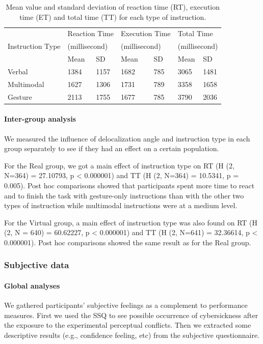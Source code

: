 \begin{table}[!t]
\renewcommand{\arraystretch}{1.3}
\caption{Mean value and standard deviation of reaction time (RT), execution time (ET) and total time (TT) for each type of instruction.}
\label{tab:metrics}
\centering
\begin{tabular}{l l l l l l l}
	\hline
    & \multicolumn{2}{p{3cm}}{Reaction Time} & \multicolumn{2}{p{3cm}}{Execution Time} & \multicolumn{2}{p{3cm}}{Total Time} \\
    Instruction Type & \multicolumn{2}{p{3cm}}{(millisecond)} & \multicolumn{2}{p{3cm}}{(millisecond)} & \multicolumn{2}{p{3cm}}{(millisecond)} \\
    \hline
    & Mean & SD & Mean & SD & Mean & SD \\
    Verbal & 1384 & 1157 & 1682 & 785 & 3065 & 1481 \\
	Multimodal & 1627 & 1306 & 1731 & 789 & 3358 & 1658 \\
	Gesture & 2113 & 1755 & 1677 & 785 & 3790 & 2036 \\ \hline
\end{tabular}
\end{table}

\paragraph{Inter-group analysis}
We measured the influence of delocalization angle and instruction type in each group separately to see if they had an effect on a certain population.

For the Real group, we got a main effect of instruction type on RT (H (2, N=364) = 27.10793, p \textless{} 0.000001) and TT (H (2, N=364) = 10.5341, p = 0.005). Post hoc comparisons showed that participants spent more time to react and to finish the task with gesture-only instructions than with the other two types of instruction while multimodal instructions were at a medium level.

For the Virtual group, a main effect of instruction type was also found on RT (H (2, N = 640) = 60.62227, p \textless{} 0.000001) and TT (H (2, N=641) = 32.36614, p \textless{} 0.000001). Post hoc comparisons showed the same result as for the Real group.

\subsubsection{Subjective data}
\paragraph{Global analyses}
We gathered participants' subjective feelings as a complement to performance measures. First we used the SSQ to see possible occurrence of cybersickness after the exposure to the experimental perceptual conflicts. Then we extracted some descriptive results (e.g., confidence feeling, etc) from the subjective questionnaire.


